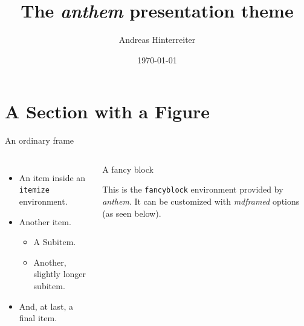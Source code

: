 \documentclass{beamer}
\title{The \emph{anthem} presentation theme}
\author{Andreas Hinterreiter}
\date{\today}
\begin{document}
\begin{frame}[plain]
	\titlepage
\end{frame}

\section{A Section with a Figure}

\begin{frame}[plain]
\sectionpage
\end{frame}

\begin{frame}{An ordinary frame}
\begin{columns}
	\begin{itemize}
		\item An item inside an \texttt{itemize} environment.
		\item Another item.
		\begin{itemize}
			\item A Subitem.
			\item Another, slightly longer subitem.
		\end{itemize}
		\item And, at last, a final item.
	\end{itemize}
	\begin{fancyblock}{A fancy block}
	\raggedright This is the \texttt{fancyblock} environment provided by \emph{anthem}.  It can be customized with \emph{mdframed} options (as seen below).
	\end{fancyblock}
\end{columns}
\end{frame}
\end{document}
